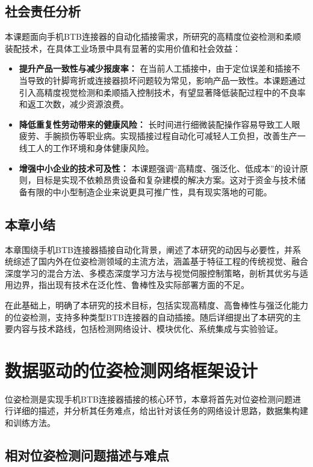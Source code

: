 \documentclass{Diploma}
\begin{document}
\section{社会责任分析}
本课题面向手机BTB连接器的自动化插接需求，所研究的高精度位姿检测和柔顺装配技术，在具体工业场景中具有显著的实用价值和社会效益：

\begin{itemize}
\item \textbf{提升产品一致性与减少报废率：} 在当前人工插接中，由于定位误差和插接不当导致的针脚弯折或连接器损坏问题较为常见，影响产品一致性。本课题通过引入高精度视觉检测和柔顺插入控制技术，有望显著降低装配过程中的不良率和返工次数，减少资源浪费。

\item \textbf{降低重复性劳动带来的健康风险：} 长时间进行细微装配操作容易导致工人眼疲劳、手腕损伤等职业病。实现插接过程自动化可减轻人工负担，改善生产一线工人的工作环境和身体健康风险。

\item \textbf{增强中小企业的技术可及性：} 本课题强调“高精度、强泛化、低成本”的设计原则，目标是实现不依赖昂贵设备和复杂建模的解决方案。这对于资金与技术储备有限的中小型制造企业来说更具可推广性，具有现实落地的可能。
\end{itemize}
\section{本章小结}
本章围绕手机BTB连接器插接自动化背景，阐述了本研究的动因与必要性，并系统综述了国内外在位姿检测领域的主流方法，涵盖基于特征工程的传统视觉、融合深度学习的混合方法、多模态深度学习方法与视觉伺服控制策略，剖析其优劣与适用边界，指出现有技术在泛化性、鲁棒性及实际部署方面的不足。

在此基础上，明确了本研究的技术目标，包括实现高精度、高鲁棒性与强泛化能力的位姿检测，支持多种类型BTB连接器的自动插接。随后详细提出了本研究的主要内容与技术路线，包括检测网络设计、模块优化、系统集成与实验验证。

\chapter[framework]{数据驱动的位姿检测网络框架设计}
位姿检测是实现手机BTB连接器插接的核心环节，本章将首先对位姿检测问题进行详细的描述，并分析其任务难点，给出针对该任务的网络设计思路，数据集构建和训练方法。

\section{相对位姿检测问题描述与难点}
\end{document}
